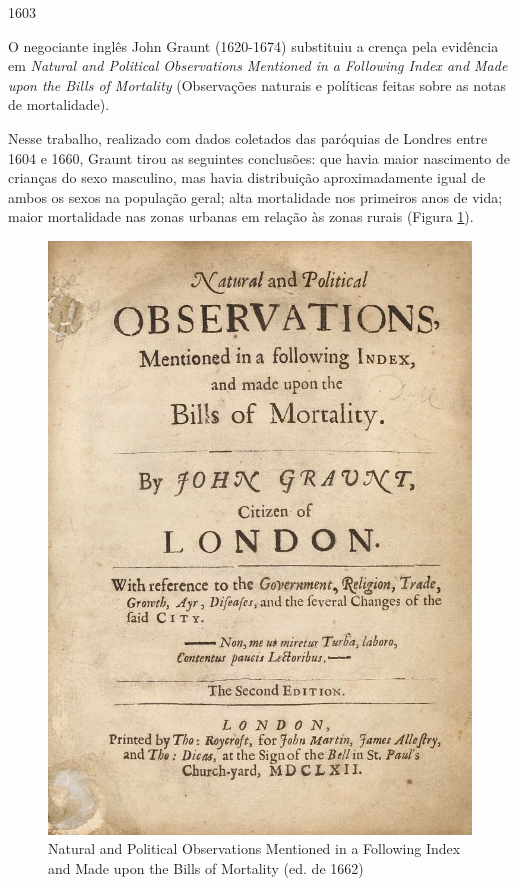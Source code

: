 \documentclass[
]{book}
\begin{document}
\hfill\break

1603

\hfill\break

O negociante inglês John Graunt (1620-1674) substituiu a crença pela evidência em \emph{Natural and Political Observations Mentioned in a Following Index and Made upon the Bills of Mortality} (Observações naturais e políticas feitas sobre as notas de mortalidade).

Nesse trabalho, realizado com dados coletados das paróquias de Londres entre 1604 e 1660, Graunt tirou as seguintes conclusões: que havia maior nascimento de crianças do sexo masculino, mas havia distribuição aproximadamente igual de ambos os sexos na população geral; alta mortalidade nos primeiros anos de vida; maior mortalidade nas zonas urbanas em relação às zonas rurais (Figura \ref{fig:figA2}).

\hfill\break

\begin{figure}

{\centering \includegraphics[width=0.75\linewidth]{images1/graunt} 

}

\caption{Natural and Political Observations Mentioned in a Following Index and Made upon the Bills of Mortality (ed. de 1662)}\label{fig:figA2}
\end{figure}
\end{document}
